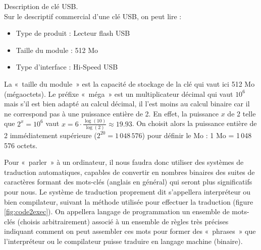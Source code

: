 \begin{ex}\label{ex:megaoctet}Description de clé USB.\\
Sur le descriptif commercial d'une clé USB, on peut lire :
\begin{itemize}
\item Type de produit  : Lecteur flash USB
\item Taille du module : 512 Mo
\item Type d'interface : Hi-Speed USB
\end{itemize}
\end{ex}
\noindent La «~taille du module~» est la capacité de stockage de la clé qui vaut ici 512 Mo (mégaoctets).
Le préfixe «~méga~» est un multiplicateur décimal qui vaut $10^6$ mais s'il est bien adapté au calcul décimal,
il l'est moins au calcul binaire car il ne correspond pas à une puissance entière de 2. 
En effet, la puissance $x$ de 2 telle que $2^x = 10^6$
vaut $\displaystyle x = 6\cdot\frac{\log(10)}{\log(2)} \approx 19.93$. On choisit alors la puissance entière de 2
immédiatement supérieure ($2^{20} = 1\,048\,576$) pour définir le Mo : 
1 Mo = 1\,048\,576 octets.

Pour «~parler~» à un ordinateur, il nous faudra donc utiliser des
systèmes de traduction automatiques, capables de convertir en nombres binaires des suites de
caractères formant des mots-clés (anglais en général) qui seront plus significatifs pour nous.
Le système de traduction proprement dit s'appellera interpréteur ou bien compilateur, suivant la
méthode utilisée pour effectuer la traduction (figure \ref{fig:code2exec}). On appellera langage de
programmation un ensemble de mots-clés (choisis arbitrairement) associé à un ensemble de règles
très précises indiquant comment on peut assembler ces mots pour former des «~phrases~» que
l'interpréteur ou le compilateur puisse traduire en langage machine (binaire).

